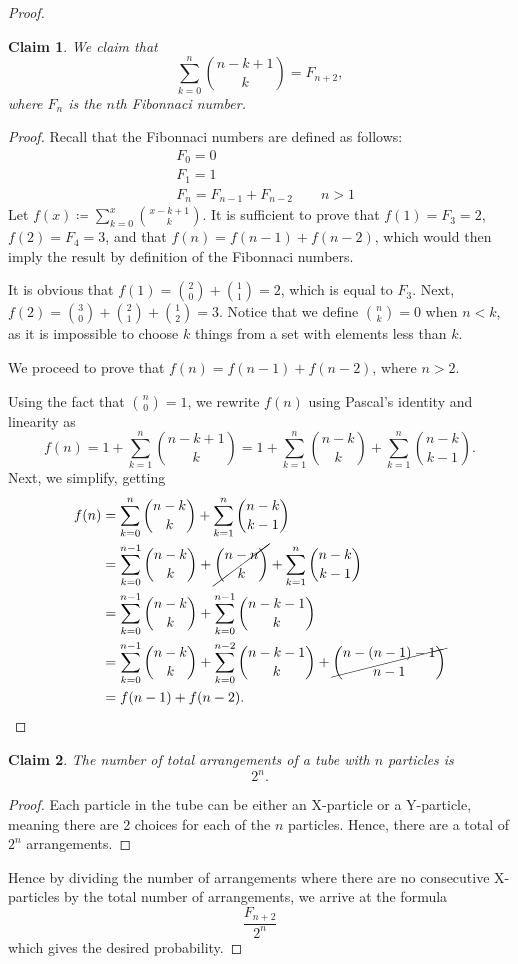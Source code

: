 \documentclass{article}
\newtheorem{claim}{Claim}[theorem]
\begin{document}
\begin{proof}
\begin{claim}
  We claim that \[
    \sum_{k=0}^n \binom{n-k+1}{k} = F_{n+2},
  \] where $F_n$ is the $n$th Fibonnaci number.
\end{claim}
\begin{proof}
  Recall that the Fibonnaci numbers are defined as follows:
  \begin{align*}
    &F_0 = 0 \\
    &F_1 = 1 \\
    &F_n = F_{n-1} + F_{n-2} \qquad n > 1
  \end{align*}
  Let $f(x)\coloneqq \sum_{k=0}^x \binom{x-k+1}{k}$. It is sufficient to prove that $f(1) = F_{3} = 2$, $f(2) = F_{4} = 3$, and that $f(n) = f(n-1) + f(n-2)$, which would then imply the result by definition of the Fibonnaci numbers.

  It is obvious that $f(1) = \binom{2}{0} + \binom{1}{1} = 2$, which is equal to $F_{3}$. Next, $f(2) = \binom{3}{0} + \binom{2}{1} + \binom{1}{2} = 3$. Notice that we define $\binom{n}{k} = 0$ when $n < k$, as it is impossible to choose $k$ things from a set with elements less than $k$.

  We proceed to prove that $f(n) = f(n-1) + f(n-2)$, where $n > 2$.

  Using the fact that $\binom{n}{0} = 1$, we rewrite $f(n)$ using Pascal's identity and linearity as \[
    f(n) = 1 + \sum_{k=1}^n \binom{n-k+1}{k} = 1 + \sum_{k=1}^n \binom{n-k}{k} + \sum_{k=1}^n \binom{n-k}{k-1}.
  \] Next, we simplify, getting
  \begin{align*}
    f(n) &= \sum_{k=0}^n \binom{n - k}{k} + \sum_{k=1}^n \binom{n-k}{k-1} \\
         &= \sum_{k=0}^{n-1} \binom{n-k}{k} + \cancel{\binom{n-n}{k}} + \sum_{k=1}^n \binom{n-k}{k-1} \\
         &= \sum_{k=0}^{n-1} \binom{n-k}{k} + \sum_{k=0}^{n-1} \binom{n-k-1}{k} \\
         &= \sum_{k=0}^{n-1} \binom{n-k}{k} + \sum_{k=0}^{n-2} \binom{n-k-1}{k} + \cancel{\binom{n-(n-1)-1}{n-1}} \\
         &= f(n-1) + f(n-2). \qedhere
  \end{align*}
\end{proof}
\begin{claim}
  The number of total arrangements of a tube with $n$ particles is \[2^n.\]
\end{claim}
\begin{proof}
  Each particle in the tube can be either an X-particle or a Y-particle, meaning there are 2 choices for each of the $n$ particles. Hence, there are a total of $2^n$ arrangements.
\end{proof}
Hence by dividing the number of arrangements where there are no consecutive X-particles by the total number of arrangements, we arrive at the formula \[\frac{F_{n+2}}{2^n}\] which gives the desired probability.
\end{proof}
\end{document}
